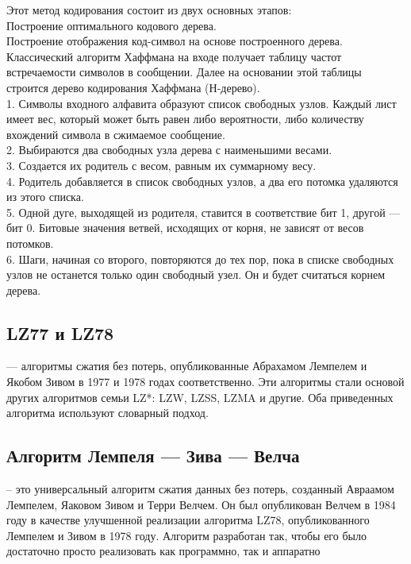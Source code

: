 \documentclass[a4paper, 12pt]{article}
\begin{document}
Этот метод кодирования состоит из двух основных этапов:\\
    Построение оптимального кодового дерева.\\
    Построение отображения код-символ на основе построенного дерева.\\

Классический алгоритм Хаффмана на входе получает таблицу частот встречаемости символов в сообщении. Далее на основании этой таблицы строится дерево кодирования Хаффмана (Н-дерево).\\

    1. Символы входного алфавита образуют список свободных узлов. Каждый лист имеет вес, который может быть равен либо вероятности, либо количеству вхождений символа в сжимаемое сообщение.\\
    2. Выбираются два свободных узла дерева с наименьшими весами.\\
    3. Создается их родитель с весом, равным их суммарному весу.\\
    4. Родитель добавляется в список свободных узлов, а два его потомка удаляются из этого списка.\\
    5. Одной дуге, выходящей из родителя, ставится в соответствие бит 1, другой — бит 0. Битовые значения ветвей, исходящих от корня, не зависят от весов потомков.\\
    6. Шаги, начиная со второго, повторяются до тех пор, пока в списке свободных узлов не останется только один свободный узел. Он и будет считаться корнем дерева.\\


\subsection*{LZ77 и LZ78}
 — алгоритмы сжатия без потерь, опубликованные Абрахамом Лемпелем и Якобом Зивом в 1977 и 1978 годах соответственно. Эти алгоритмы стали основой других алгоритмов семьи LZ*: LZW, LZSS, LZMA и другие. Оба приведенных алгоритма используют словарный подход.\\

\subsection*{Алгоритм Лемпеля — Зива — Велча}
-- это универсальный алгоритм сжатия данных без потерь, созданный Авраамом Лемпелем, Яаковом Зивом и Терри Велчем. Он был опубликован Велчем в 1984 году в качестве улучшенной реализации алгоритма LZ78, опубликованного Лемпелем и Зивом в 1978 году. Алгоритм разработан так, чтобы его было достаточно просто реализовать как программно, так и аппаратно\\
\end{document}
